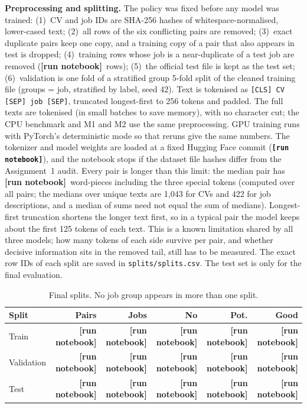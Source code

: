 \documentclass[11pt]{article}
\newcommand{\RUN}{\textbf{[run notebook]}}
\newcommand{\NRemovedNearDup}{\RUN}
\newcommand{\NTrain}{\RUN}\newcommand{\NVal}{\RUN}\newcommand{\NTest}{\RUN}
\newcommand{\NTrainJobs}{\RUN}\newcommand{\NValJobs}{\RUN}\newcommand{\NTestJobs}{\RUN}
\newcommand{\NTrainNo}{\RUN}\newcommand{\NTrainPot}{\RUN}\newcommand{\NTrainGood}{\RUN}
\newcommand{\NValNo}{\RUN}\newcommand{\NValPot}{\RUN}\newcommand{\NValGood}{\RUN}
\newcommand{\NTestNo}{\RUN}\newcommand{\NTestPot}{\RUN}\newcommand{\NTestGood}{\RUN}
\newcommand{\TokPairMedian}{\RUN}\newcommand{\TokPairNinety}{\RUN}\newcommand{\TruncPct}{\RUN}
\newcommand{\StudentRev}{\RUN}
\begin{document}
\textbf{Preprocessing and splitting.} The policy was fixed before any model was trained:
(1)~CV and job IDs are SHA-256 hashes of whitespace-normalised, lower-cased text;
(2)~all rows of the six conflicting pairs are removed;
(3)~exact duplicate pairs keep one copy, and a training copy of a pair that also appears in test is dropped;
(4)~training rows whose job is a near-duplicate of a test job are removed (\NRemovedNearDup\ rows);
(5)~the official test file is kept as the test set;
(6)~validation is one fold of a stratified group 5-fold split of the cleaned training file (groups = job, stratified by label, seed 42).
Text is tokenised as \texttt{[CLS] CV [SEP] job [SEP]}, truncated longest-first to 256 tokens and padded. The full texts are tokenised (in small batches to save memory), with no character cut; the CPU benchmark and M1 and M2 use the same preprocessing. GPU training runs with PyTorch's deterministic mode so that reruns give the same numbers. The tokenizer and model weights are loaded at a fixed Hugging Face commit (\texttt{\StudentRev}), and the notebook stops if the dataset file hashes differ from the Assignment~1 audit. Every pair is longer than this limit: the median pair has \TokPairMedian\ word-pieces including the three special tokens (computed over all pairs; the medians over unique texts are 1,043 for CVs and 422 for job descriptions, and a median of sums need not equal the sum of medians). Longest-first truncation shortens the longer text first, so in a typical pair the model keeps about the first 125 tokens of each text. This is a known limitation shared by all three models; how many tokens of each side survive per pair, and whether decisive information sits in the removed tail, still has to be measured. The exact row IDs of each split are saved in \texttt{splits/splits.csv}. The test set is only for the final evaluation.

\begin{table}[t]
\centering\small
\begin{tabular}{@{}lrrrrr@{}}
\toprule
Split & Pairs & Jobs & No & Pot. & Good \\
\midrule
Train & \NTrain & \NTrainJobs & \NTrainNo & \NTrainPot & \NTrainGood \\
Validation & \NVal & \NValJobs & \NValNo & \NValPot & \NValGood \\
Test & \NTest & \NTestJobs & \NTestNo & \NTestPot & \NTestGood \\
\bottomrule
\end{tabular}
\caption{Final splits. No job group appears in more than one split.}
\label{tab:splits}
\end{table}
\end{document}
